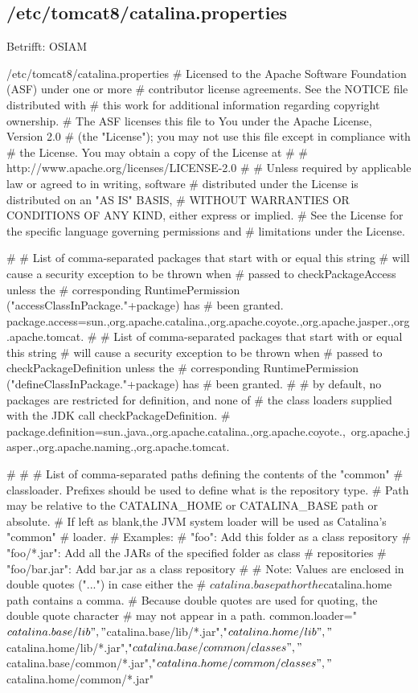 \documentclass{tarentanleitung}
\begin{document}
\subsection{/etc/tomcat8/catalina.properties}\label{subsec:refcfg-tc-prop}

Betrifft: OSIAM

\begin{lstdump}{/etc/tomcat8/catalina.properties}
# Licensed to the Apache Software Foundation (ASF) under one or more
# contributor license agreements.  See the NOTICE file distributed with
# this work for additional information regarding copyright ownership.
# The ASF licenses this file to You under the Apache License, Version 2.0
# (the "License"); you may not use this file except in compliance with
# the License.  You may obtain a copy of the License at
#
#     http://www.apache.org/licenses/LICENSE-2.0
#
# Unless required by applicable law or agreed to in writing, software
# distributed under the License is distributed on an "AS IS" BASIS,
# WITHOUT WARRANTIES OR CONDITIONS OF ANY KIND, either express or implied.
# See the License for the specific language governing permissions and
# limitations under the License.

#
# List of comma-separated packages that start with or equal this string
# will cause a security exception to be thrown when
# passed to checkPackageAccess unless the
# corresponding RuntimePermission ("accessClassInPackage."+package) has
# been granted.
package.access=sun.,org.apache.catalina.,org.apache.coyote.,org.apache.jasper.,org.apache.tomcat.
#
# List of comma-separated packages that start with or equal this string
# will cause a security exception to be thrown when
# passed to checkPackageDefinition unless the
# corresponding RuntimePermission ("defineClassInPackage."+package) has
# been granted.
#
# by default, no packages are restricted for definition, and none of
# the class loaders supplied with the JDK call checkPackageDefinition.
#
package.definition=sun.,java.,org.apache.catalina.,org.apache.coyote.,\
org.apache.jasper.,org.apache.naming.,org.apache.tomcat.

#
#
# List of comma-separated paths defining the contents of the "common"
# classloader. Prefixes should be used to define what is the repository type.
# Path may be relative to the CATALINA_HOME or CATALINA_BASE path or absolute.
# If left as blank,the JVM system loader will be used as Catalina's "common"
# loader.
# Examples:
#     "foo": Add this folder as a class repository
#     "foo/*.jar": Add all the JARs of the specified folder as class
#                  repositories
#     "foo/bar.jar": Add bar.jar as a class repository
#
# Note: Values are enclosed in double quotes ("...") in case either the
#       ${catalina.base} path or the ${catalina.home} path contains a comma.
#       Because double quotes are used for quoting, the double quote character
#       may not appear in a path.
common.loader="${catalina.base}/lib","${catalina.base}/lib/*.jar","${catalina.home}/lib","${catalina.home}/lib/*.jar","${catalina.base}/common/classes","${catalina.base}/common/*.jar","${catalina.home}/common/classes","${catalina.home}/common/*.jar"


\end{lstdump}
\end{document}
